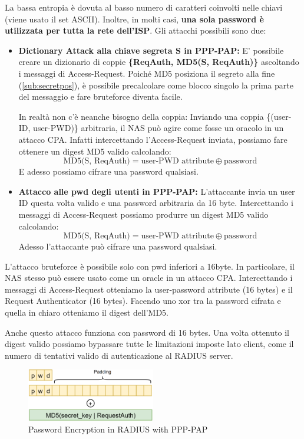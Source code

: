 \begin{proposition}
La bassa entropia è dovuta al basso numero di caratteri coinvolti nelle chiavi (viene usato il set ASCII). Inoltre, in molti casi, \textbf{una sola password è utilizzata per tutta la rete dell'ISP}. Gli attacchi possibili sono due:
\begin{itemize}
    \item \textbf{Dictionary Attack alla chiave segreta S in PPP-PAP:} E' possibile creare un dizionario di coppie \textbf{\{ReqAuth, MD5(S, ReqAuth)\}} ascoltando i messaggi di Access-Request. Poiché MD5 posiziona il segreto alla fine (\cref{sub:secretpos}), è possibile precalcolare come blocco singolo la prima parte del messaggio e fare bruteforce diventa facile.\\
    \begin{remark}
    In realtà non c'è neanche bisogno della coppia: Inviando una coppia \{(user-ID, user-PWD)\} arbitraria, il NAS può agire come fosse un oracolo in un attacco CPA. Infatti intercettando l'Access-Request inviata, possiamo fare ottenere un digest MD5 valido calcolando:
    \[\text{MD5(S, ReqAuth)}=\text{user-PWD attribute}\oplus\text{password}\]
    E adesso possiamo cifrare una password qualsiasi.
    \end{remark}
    \item \textbf{Attacco alle pwd degli utenti in PPP-PAP:} L'attaccante invia un user ID questa volta valido e una password arbitraria da 16 byte. Intercettando i messaggi di Access-Request possiamo produrre un digest MD5 valido calcolando:
    \[\text{MD5(S, ReqAuth)}=\text{user-PWD attribute}\oplus\text{password}\]
    Adesso l'attaccante può cifrare una password qualsiasi.
\end{itemize}
\end{proposition}
\begin{remark}
L'attacco bruteforce è possibile solo con pwd inferiori a 16byte. In particolare, il NAS stesso può essere usato come un oracle in un attacco CPA. Intercettando i messaggi di Access-Request otteniamo la user-password attribute (16 bytes) e il Request Authenticator (16 bytes). Facendo uno xor tra la password cifrata e quella in chiaro otteniamo il digest dell'MD5.
\end{remark}
\begin{remark}
Anche questo attacco funziona con password di 16 bytes. Una volta ottenuto il digest valido possiamo bypassare tutte le limitazioni imposte lato client, come il numero di tentativi valido di autenticazione al RADIUS server.
\end{remark}
\begin{figure}[h]
    \centering
    \includegraphics[width=0.5\textwidth]{image/radpwdenc.png}
    \caption{Password Encryption in RADIUS with PPP-PAP}
    \label{fig:radpwdenc}
\end{figure}
